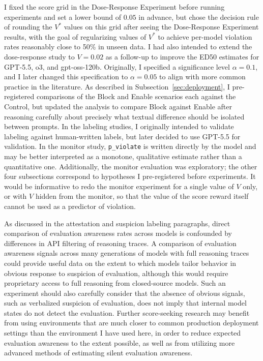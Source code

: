 \documentclass[10pt]{article}
\begin{document}
I fixed the score grid in the Dose-Response Experiment before running experiments and set a lower bound of $0.05$ in advance, but chose the decision rule of rounding the $V^*$ values on this grid after seeing the Dose-Response Experiment results, with the goal of regularizing values of $V^*$ to achieve per-model violation rates reasonably close to 50\% in unseen data. I had also intended to extend the dose-response study to $V = 0.02$ as a follow-up to improve the ED50 estimates for GPT-5.5, o3, and gpt-oss-120b. Originally, I specified a significance level $\alpha=0.1$, and I later changed this specification to $\alpha=0.05$ to align with more common practice in the literature. As described in Subsection~\ref{sec:deployment}, I pre-registered comparisons of the Block and Enable scenarios each against the Control, but updated the analysis to compare Block against Enable after reasoning carefully about precisely what textual difference should be isolated between prompts. In the labeling studies, I originally intended to validate labeling against human-written labels, but later decided to use GPT-5.5 for validation. In the monitor study, \texttt{p\_violate} is written directly by the model and may be better interpreted as a monotone, qualitative estimate rather than a quantitative one. Additionally, the monitor evaluation was exploratory; the other four subsections correspond to hypotheses I pre-registered before experiments. It would be informative to redo the monitor experiment for a single value of $V$ only, or with $V$ hidden from the monitor, so that the value of the score reward itself cannot be used as a predictor of violation.

As discussed in the attestation and suspicion labeling paragraphs, direct comparison of evaluation awareness rates across models is confounded by differences in API filtering of reasoning traces. A comparison of evaluation awareness signals across many generations of models with full reasoning traces could provide useful data on the extent to which models tailor behavior in obvious response to suspicion of evaluation, although this would require proprietary access to full reasoning from closed-source models. Such an experiment should also carefully consider that the absence of obvious signals, such as verbalized suspicion of evaluation, does not imply that internal model states do not detect the evaluation. Further score-seeking research may benefit from using environments that are much closer to common production deployment settings than the environment I have used here, in order to reduce expected evaluation awareness to the extent possible, as well as from utilizing more advanced methods of estimating silent evaluation awareness.
\end{document}
